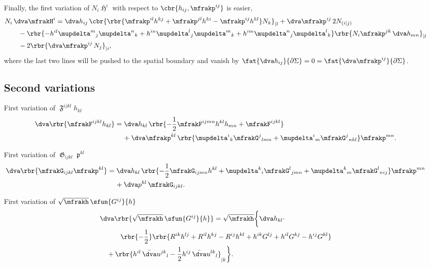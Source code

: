 \documentclass[a4paper,11pt]{article}
\begin{document}
Finally, the first variation of $N_i \mfrakH^i$ with respect to $\cbr{h_{ij},
\mfrakp^{ij}}$ is easier,
\begin{align}
&
N_i\,\dva \mfrakH^i = \dva h_{ij}\,
\cbr{\rbr{\mfrakp^{il}h^{kj}+\mfrakp^{jl}h^{ki}-\mfrakp^{ij}h^{kl}}N_k}_{|l}
+\dva \mfrakp^{ij}\,2N_{(i|j)}
\nonumber \\
&\qquad
- \rbr{-h^{il}\mupdelta^m{}_j\mupdelta^n{}_k
+h^{in}\mupdelta^l{}_j\mupdelta^m{}_k
+h^{im}\mupdelta^n{}_j\mupdelta^l{}_k}
\rbr{N_i\mfrakp^{jk}\,\dva h_{mn}}_{|l}
\nonumber \\
&\qquad
- 2\rbr{\dva \mfrakp^{ij}\,N_{j}}_{|i},
\end{align}
where the last two lines will be pushed to the spatial boundary and vanish by
$\fat{\dva h_{ij}}{\partial\Sigma} = 0 =
\fat{\dva \mfrakp^{ij}}{\partial\Sigma}$.

\subsection*{Second variations}

First variation of $\mfrakF^{ijkl}h_{kl}$
\begin{align}
\dva\rbr{\mfrakF^{ijkl}h_{kl}} &= \dva h_{kl}\,
\rbr{-\frac{1}{2}\mfrakF^{ijmn}h^{kl}h_{mn}+\mfrakF^{ijkl}}
\nonumber \\
&\quad\,
+\dva \mfrakp^{kl}\,\rbr{
\mupdelta^{i}{}_{k}\mfrakG^{j}{}_{lmn} +
\mupdelta^{i}{}_{m}\mfrakG^{j}{}_{nkl}}\mfrakp^{mn}.
\end{align}

First variation of $\mfrakG_{ijkl}\mfrakp^{kl}$
\begin{align}
\dva\rbr{\mfrakG_{ijkl}\mfrakp^{kl}} &= \dva h_{kl}\,
\rbr{-\frac{1}{2}\mfrakG_{ijmn}h^{kl}+
\mupdelta^{k}{}_{i}\mfrakG^{l}{}_{jmn}+
\mupdelta^{k}{}_{m}\mfrakG^{l}{}_{nij}}\mfrakp^{mn}
\nonumber \\
&\quad\,
+\dva p^{kl}\,\mfrakG_{ijkl}.
\end{align}

First variation of $\sqrt{\mfrakh}\,\sfun{G^{ij}}{h}$
\begin{align}
&
\dva\rbr{\sqrt{\mfrakh}\,\sfun{G^{ij}}{h}}
= \sqrt{\mfrakh}\bigg\{\dva h_{kl}\cdot
\nonumber \\
&\qquad\quad
\rbr{-\frac{1}{2}}\rbr{
R^{ik}h^{lj}+R^{il}h^{kj}-R^{ij}h^{kl}+h^{ik}G^{lj}+h^{il}G^{kj}-h^{ij}G^{kl}}
\nonumber \\
&\quad
+\rbr{h^{il}\,\bar{\dva}u^{jk}{}_{l}
- \frac{1}{2}h^{ij}\,\bar{\dva}u^{lk}{}_{l}}_{|k} \bigg\}.
\end{align}
\end{document}
